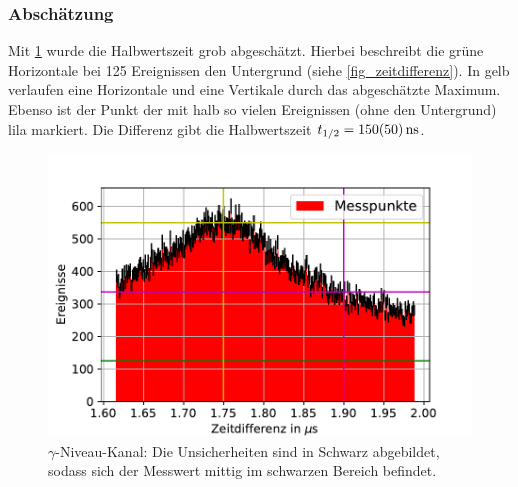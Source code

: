 \documentclass[
	a4paper,
	12pt,
	pagesize,
	ngerman
]{scrartcl}
\begin{document}
		\subsubsection*{Abschätzung}
		Mit \cref{fig_zeitdifferenz_zoom} wurde die Halbwertszeit grob abgeschätzt.
		Hierbei beschreibt die grüne Horizontale bei \SI{125}{} Ereignissen den Untergrund (siehe \cref{fig_zeitdifferenz}).
		In gelb verlaufen eine Horizontale und eine Vertikale durch das abgeschätzte Maximum.
		Ebenso ist der Punkt der mit halb so vielen Ereignissen (ohne den Untergrund) lila markiert.
		Die Differenz gibt die Halbwertszeit $t_{1/2}=\SI{150+-50}{ns}$.
		\begin{figure}[H]
				\includegraphics[width= 0.9 \linewidth]{img/Zeitdifferenzen_zoom}
				\caption{
					$\gamma$-Niveau-Kanal:
				Die Unsicherheiten sind in Schwarz abgebildet, sodass sich der Messwert mittig im schwarzen Bereich befindet.
				}
				\label{fig_zeitdifferenz_zoom}
		\end{figure}
\end{document}
